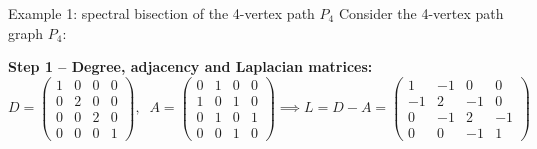 \documentclass[aspectratio=169]{beamer}\usepackage[]{graphicx}\usepackage[]{xcolor}
\begin{document}

\begin{frame}{Example 1: spectral bisection of the 4-vertex path $P_4$}
Consider the 4-vertex path graph $P_4$:
\begin{center}
\end{center}
\vfill
\textbf{Step 1 -- Degree, adjacency and Laplacian matrices:}
{\setlength{\arraycolsep}{3.5pt}
\[
D = \begin{pmatrix}
1 & 0 & 0 & 0 \\
0 & 2 & 0 & 0 \\
0 & 0 & 2 & 0 \\
0 & 0 & 0 & 1
\end{pmatrix}, \;\;
A = \begin{pmatrix}
0 & 1 & 0 & 0 \\
1 & 0 & 1 & 0 \\
0 & 1 & 0 & 1 \\
0 & 0 & 1 & 0
\end{pmatrix} \implies
L = D - A = \begin{pmatrix}
1 & -1 & 0 & 0 \\
-1 & 2 & -1 & 0 \\
0 & -1 & 2 & -1 \\
0 & 0 & -1 & 1
\end{pmatrix}
\]
}
\end{frame}
\end{document}

